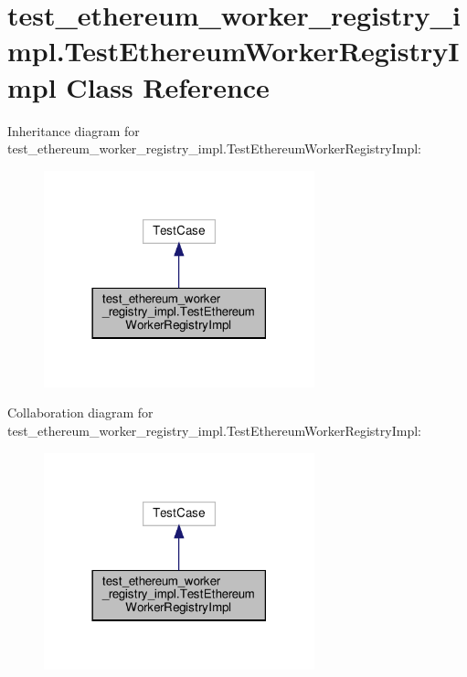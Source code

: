 \hypertarget{classtest__ethereum__worker__registry__impl_1_1TestEthereumWorkerRegistryImpl}{}\section{test\+\_\+ethereum\+\_\+worker\+\_\+registry\+\_\+impl.\+Test\+Ethereum\+Worker\+Registry\+Impl Class Reference}
\label{classtest__ethereum__worker__registry__impl_1_1TestEthereumWorkerRegistryImpl}


Inheritance diagram for test\+\_\+ethereum\+\_\+worker\+\_\+registry\+\_\+impl.\+Test\+Ethereum\+Worker\+Registry\+Impl\+:
\nopagebreak
\begin{figure}[H]
\begin{center}
\leavevmode
\includegraphics[width=222pt]{classtest__ethereum__worker__registry__impl_1_1TestEthereumWorkerRegistryImpl__inherit__graph}
\end{center}
\end{figure}


Collaboration diagram for test\+\_\+ethereum\+\_\+worker\+\_\+registry\+\_\+impl.\+Test\+Ethereum\+Worker\+Registry\+Impl\+:
\nopagebreak
\begin{figure}[H]
\begin{center}
\leavevmode
\includegraphics[width=222pt]{classtest__ethereum__worker__registry__impl_1_1TestEthereumWorkerRegistryImpl__coll__graph}
\end{center}
\end{figure}
